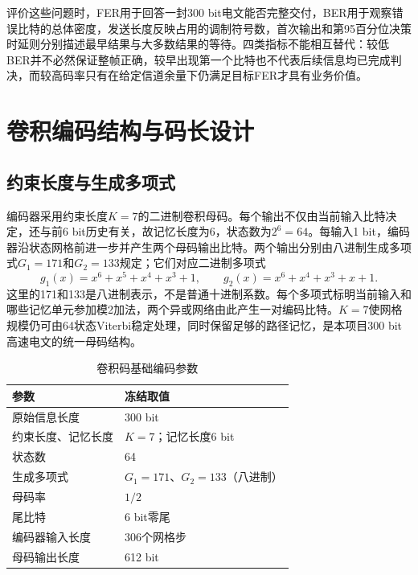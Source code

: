 评价这些问题时，FER用于回答一封300 bit电文能否完整交付，BER用于观察错误比特的总体密度，发送长度反映占用的调制符号数，首次输出和第95百分位决策时延则分别描述最早结果与大多数结果的等待。四类指标不能相互替代：较低BER并不必然保证整帧正确，较早出现第一个比特也不代表后续信息均已完成判决，而较高码率只有在给定信道余量下仍满足目标FER才具有业务价值。

\section{卷积编码结构与码长设计}

\subsection{约束长度与生成多项式}

编码器采用约束长度$K=7$的二进制卷积母码。每个输出不仅由当前输入比特决定，还与前6 bit历史有关，故记忆长度为6，状态数为$2^6=64$。每输入1 bit，编码器沿状态网格前进一步并产生两个母码输出比特。两个输出分别由八进制生成多项式$G_1=171$和$G_2=133$规定；它们对应二进制多项式
\begin{equation}
  g_1(x)=x^6+x^5+x^4+x^3+1,\qquad
  g_2(x)=x^6+x^4+x^3+x+1 .
\end{equation}
这里的171和133是八进制表示，不是普通十进制系数。每个多项式标明当前输入和哪些记忆单元参加模2加法，两个异或网络由此产生一对编码比特。$K=7$使网格规模仍可由64状态Viterbi稳定处理，同时保留足够的路径记忆，是本项目300 bit高速电文的统一母码结构。

\begin{table}[htbp]
  \centering
  \small
  \caption{卷积码基础编码参数}
  \label{tab:cc-basic-parameters}
  \begin{tabular}{p{}p{}}
    \toprule
    参数 & 冻结取值 \\
    \midrule
    原始信息长度 & 300 bit \\
    约束长度、记忆长度 & $K=7$；记忆长度6 bit \\
    状态数 & 64 \\
    生成多项式 & $G_1=171$、$G_2=133$（八进制） \\
    母码率 & $1/2$ \\
    尾比特 & 6 bit零尾 \\
    编码器输入长度 & 306个网格步 \\
    母码输出长度 & 612 bit \\
    \bottomrule
  \end{tabular}
\end{table}

